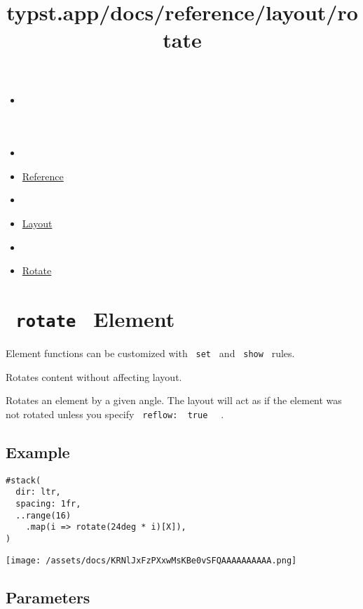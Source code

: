 \title{typst.app/docs/reference/layout/rotate}

\begin{itemize}
\tightlist
\item
  \href{/docs}{}
\item
  
\item
  \href{/docs/reference/}{Reference}
\item
  
\item
  \href{/docs/reference/layout/}{Layout}
\item
  
\item
  \href{/docs/reference/layout/rotate/}{Rotate}
\end{itemize}

\section{\texorpdfstring{\texttt{\ rotate\ } {{ Element
}}}{ rotate   Element }}\label{summary}

\label{element-tooltip}
Element functions can be customized with \texttt{\ set\ } and
\texttt{\ show\ } rules.

Rotates content without affecting layout.

Rotates an element by a given angle. The layout will act as if the
element was not rotated unless you specify
\texttt{\ reflow:\ }{\texttt{\ true\ }}\texttt{\ } .

\subsection{Example}\label{example}

\begin{verbatim}
#stack(
  dir: ltr,
  spacing: 1fr,
  ..range(16)
    .map(i => rotate(24deg * i)[X]),
)
\end{verbatim}

\texttt{[image: /assets/docs/KRNlJxFzPXxwMsKBe0vSFQAAAAAAAAAA.png]}

\subsection{\texorpdfstring{{ Parameters
}}{ Parameters }}\label{parameters}

